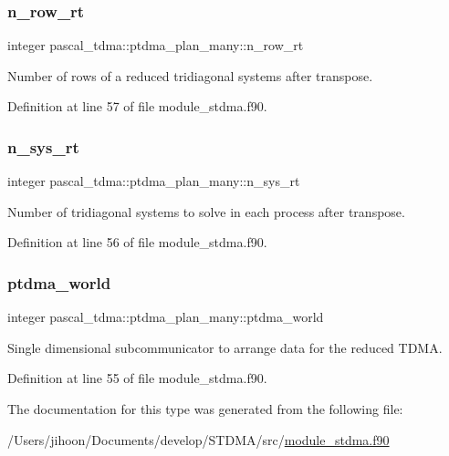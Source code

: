 \subsubsection{\texorpdfstring{n\_row\_rt}{n\_row\_rt}}
{\footnotesize\ttfamily integer pascal\+\_\+tdma\+::ptdma\+\_\+plan\+\_\+many\+::n\+\_\+row\+\_\+rt}



Number of rows of a reduced tridiagonal systems after transpose. 



Definition at line 57 of file module\+\_\+stdma.\+f90.

\mbox{\label{structpascal__tdma_1_1ptdma__plan__many_a22b42947ab742f83aad3bbeb3a42a0f6}} 
\subsubsection{\texorpdfstring{n\_sys\_rt}{n\_sys\_rt}}
{\footnotesize\ttfamily integer pascal\+\_\+tdma\+::ptdma\+\_\+plan\+\_\+many\+::n\+\_\+sys\+\_\+rt}



Number of tridiagonal systems to solve in each process after transpose. 



Definition at line 56 of file module\+\_\+stdma.\+f90.

\mbox{\label{structpascal__tdma_1_1ptdma__plan__many_acb7e645e37c791564905c6e2808db0c6}} 
\subsubsection{\texorpdfstring{ptdma\_world}{ptdma\_world}}
{\footnotesize\ttfamily integer pascal\+\_\+tdma\+::ptdma\+\_\+plan\+\_\+many\+::ptdma\+\_\+world}



Single dimensional subcommunicator to arrange data for the reduced T\+D\+MA. 



Definition at line 55 of file module\+\_\+stdma.\+f90.



The documentation for this type was generated from the following file\+:\begin{DoxyCompactItemize}
\item 
/\+Users/jihoon/\+Documents/develop/\+S\+T\+D\+M\+A/src/\mbox{\hyperlink{module__stdma_8f90}{module\+\_\+stdma.\+f90}}\end{DoxyCompactItemize}
